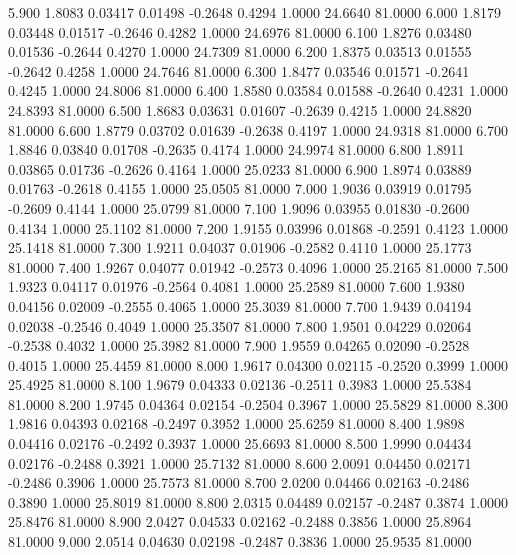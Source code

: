    5.900   1.8083   0.03417   0.01498  -0.2648   0.4294   1.0000  24.6640  81.0000
   6.000   1.8179   0.03448   0.01517  -0.2646   0.4282   1.0000  24.6976  81.0000
   6.100   1.8276   0.03480   0.01536  -0.2644   0.4270   1.0000  24.7309  81.0000
   6.200   1.8375   0.03513   0.01555  -0.2642   0.4258   1.0000  24.7646  81.0000
   6.300   1.8477   0.03546   0.01571  -0.2641   0.4245   1.0000  24.8006  81.0000
   6.400   1.8580   0.03584   0.01588  -0.2640   0.4231   1.0000  24.8393  81.0000
   6.500   1.8683   0.03631   0.01607  -0.2639   0.4215   1.0000  24.8820  81.0000
   6.600   1.8779   0.03702   0.01639  -0.2638   0.4197   1.0000  24.9318  81.0000
   6.700   1.8846   0.03840   0.01708  -0.2635   0.4174   1.0000  24.9974  81.0000
   6.800   1.8911   0.03865   0.01736  -0.2626   0.4164   1.0000  25.0233  81.0000
   6.900   1.8974   0.03889   0.01763  -0.2618   0.4155   1.0000  25.0505  81.0000
   7.000   1.9036   0.03919   0.01795  -0.2609   0.4144   1.0000  25.0799  81.0000
   7.100   1.9096   0.03955   0.01830  -0.2600   0.4134   1.0000  25.1102  81.0000
   7.200   1.9155   0.03996   0.01868  -0.2591   0.4123   1.0000  25.1418  81.0000
   7.300   1.9211   0.04037   0.01906  -0.2582   0.4110   1.0000  25.1773  81.0000
   7.400   1.9267   0.04077   0.01942  -0.2573   0.4096   1.0000  25.2165  81.0000
   7.500   1.9323   0.04117   0.01976  -0.2564   0.4081   1.0000  25.2589  81.0000
   7.600   1.9380   0.04156   0.02009  -0.2555   0.4065   1.0000  25.3039  81.0000
   7.700   1.9439   0.04194   0.02038  -0.2546   0.4049   1.0000  25.3507  81.0000
   7.800   1.9501   0.04229   0.02064  -0.2538   0.4032   1.0000  25.3982  81.0000
   7.900   1.9559   0.04265   0.02090  -0.2528   0.4015   1.0000  25.4459  81.0000
   8.000   1.9617   0.04300   0.02115  -0.2520   0.3999   1.0000  25.4925  81.0000
   8.100   1.9679   0.04333   0.02136  -0.2511   0.3983   1.0000  25.5384  81.0000
   8.200   1.9745   0.04364   0.02154  -0.2504   0.3967   1.0000  25.5829  81.0000
   8.300   1.9816   0.04393   0.02168  -0.2497   0.3952   1.0000  25.6259  81.0000
   8.400   1.9898   0.04416   0.02176  -0.2492   0.3937   1.0000  25.6693  81.0000
   8.500   1.9990   0.04434   0.02176  -0.2488   0.3921   1.0000  25.7132  81.0000
   8.600   2.0091   0.04450   0.02171  -0.2486   0.3906   1.0000  25.7573  81.0000
   8.700   2.0200   0.04466   0.02163  -0.2486   0.3890   1.0000  25.8019  81.0000
   8.800   2.0315   0.04489   0.02157  -0.2487   0.3874   1.0000  25.8476  81.0000
   8.900   2.0427   0.04533   0.02162  -0.2488   0.3856   1.0000  25.8964  81.0000
   9.000   2.0514   0.04630   0.02198  -0.2487   0.3836   1.0000  25.9535  81.0000

